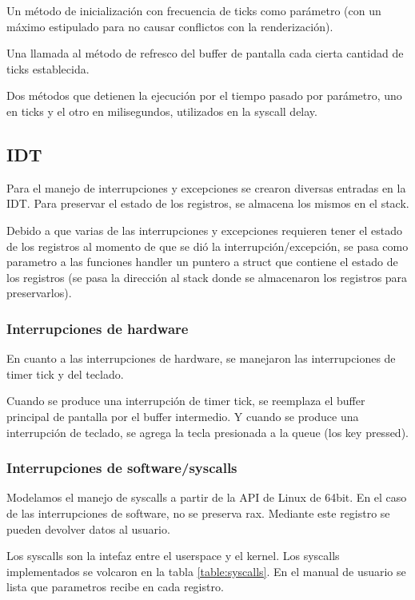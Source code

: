 \documentclass{article}
\begin{document}
Un método de inicialización con frecuencia de ticks como parámetro (con un máximo estipulado para no causar conflictos con la renderización).

Una llamada al método de refresco del buffer de pantalla cada cierta cantidad de ticks establecida.

Dos métodos que detienen la ejecución por el tiempo pasado por parámetro, uno en ticks y el otro en milisegundos, utilizados en la syscall delay.

\subsection {IDT}

Para el manejo de interrupciones y excepciones se crearon diversas entradas en la IDT. Para preservar el estado de los registros, se almacena los mismos en el stack.

Debido a que varias de las interrupciones y excepciones requieren tener el estado de los registros al momento de que se dió la interrupción/excepción, se pasa como parametro a las funciones handler un puntero a struct que contiene el estado de los registros (se pasa la dirección al stack donde se almacenaron los registros para preservarlos).

\subsubsection {Interrupciones de hardware}

En cuanto a las interrupciones de hardware, se manejaron las interrupciones de timer tick y del teclado.

Cuando se produce una interrupción de timer tick, se reemplaza el buffer principal de pantalla por el buffer intermedio. Y cuando se produce una interrupción de teclado, se agrega la tecla presionada a la queue (los key pressed).

\subsubsection {Interrupciones de software/syscalls}

Modelamos el manejo de syscalls a partir de la API de Linux de 64bit. En el caso de las interrupciones de software, no se preserva rax. Mediante este registro se pueden devolver datos al usuario.

Los syscalls son la intefaz entre el userspace y el kernel. Los syscalls implementados se volcaron en la tabla \ref{table:syscalls}. En el manual de usuario se lista que parametros recibe en cada registro.
\end{document}
